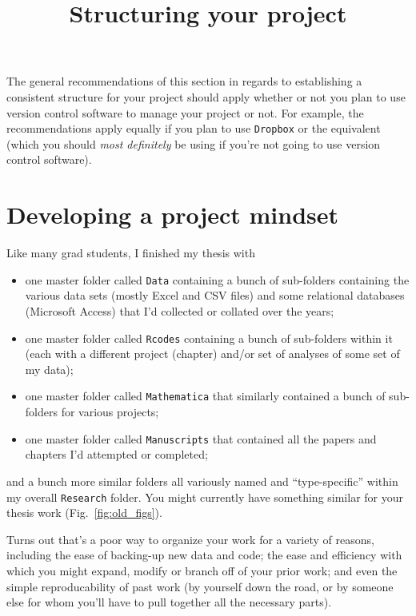 \documentclass[12pt,letterpaper]{article}
\author{}
\title{Structuring your project}
\date{}
\begin{document}
\maketitle

The general recommendations of this section in regards to establishing a consistent structure for your project should apply whether or not you plan to use version control software to manage your project or not.
For example, the recommendations apply equally if you plan to use \texttt{Dropbox} or the equivalent (which you should \emph{most definitely} be using if you're not going to use version control software).

\section{Developing a project mindset} \label{projectmindset}

Like many grad students, I finished my thesis with
\begin{itemize}
	\item one master folder called \texttt{Data} containing a bunch of sub-folders containing the various data sets (mostly Excel and CSV files) and some relational databases (Microsoft Access) that I'd collected or collated over the years;
	\item one master folder called \texttt{Rcodes} containing a bunch of sub-folders within it (each with a different project (chapter) and/or set of analyses of some set of my data);
	\item one master folder called \texttt{Mathematica} that similarly contained a bunch of sub-folders for various projects;
	\item one master folder called \texttt{Manuscripts} that contained all the papers and chapters I'd attempted or completed;
\end{itemize}
and a bunch more similar folders all variously named and ``type-specific'' within my overall \texttt{Research} folder.
You might currently have something similar for your thesis work (Fig.~\ref{fig:old_figs}).

Turns out that's a poor way to organize your work for a variety of reasons, including the ease of backing-up new data and code;
the ease and efficiency with which you might expand, modify or branch off of your prior work;
and even the simple reproducability of past work (by yourself down the road, or by someone else for whom you'll have to pull together all the necessary parts).
\end{document}
